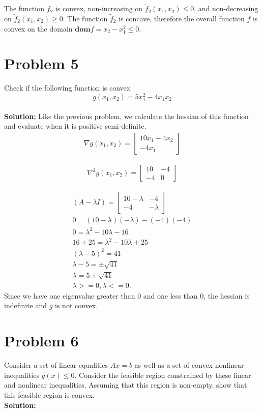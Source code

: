 \documentclass[11pt]{article}
\begin{document}
The function $f_2$ is convex, non-increasing on $\tilde{f}_2(x_1, x_2) \leq 0$, and non-decreasing on $\tilde{f}_2(x_1, x_2) \geq 0$.
The function $\tilde{f}_2$ is concave, therefore the overall function $f$ is convex on the domain $\textbf{dom} f = x_2 - x_1^2 \leq 0$.


\section{Problem 5}
Check if the following function is convex
\begin{equation*}
  g(x_1, x_2) = 5 x_1^2 - 4x_1 x_2
\end{equation*}
\\
\textbf{Solution: }
Like the previous problem, we calculate the hessian of this function and evaluate when it is positive semi-definite.
\begin{align*}
  \nabla g(x_1, x_2) = 
  \begin{bmatrix}
    10 x_1 - 4 x_2 \\
    -4 x_1
  \end{bmatrix}
\end{align*}

\begin{align*}
  \nabla^2 g(x_1, x_2) = 
  \begin{bmatrix}
    10  & -4 \\
    -4 & 0
  \end{bmatrix}
\end{align*}

\begin{align*}
  (A - \lambda I) = 
  \begin{bmatrix}
    10 - \lambda  & -4 \\
    -4 & - \lambda
  \end{bmatrix}
  \\
  0 = (10- \lambda)(-\lambda) - (-4)(-4) \\
  0 = \lambda^2 - 10 \lambda - 16  \\
  16 + 25 = \lambda^2 - 10 \lambda + 25 \\
  (\lambda - 5)^2 = 41 \\
  \lambda - 5 = \pm \sqrt{41} \\
  \lambda = 5 \pm \sqrt{41} \\
  \lambda >= 0, \lambda <=0.
\end{align*}
Since we have one eigenvalue greater than 0 and one less than 0, the hessian is indefinite and $g$ is not convex.

\section{Problem 6}
Consider a set of linear equalities $Ax = b$ as well as a set of convex nonlinear inequalities $g(x) \leq 0$. 
Consider the feasible region constrained by these linear and nonlinear inequalities.
Assuming that this region is non-empty, show that this feasible region is convex.
\\
\textbf{Solution: }
\end{document}
